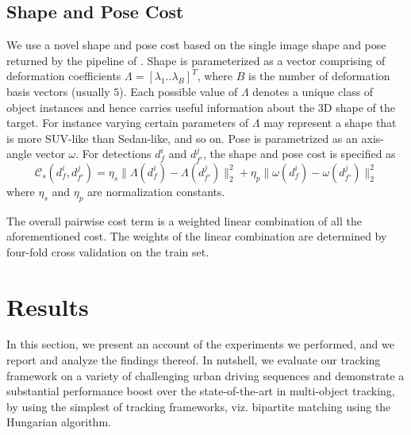 \documentclass[letterpaper, 10 pt, conference]{ieeeconf}
\begin{document}
\subsection{Shape and Pose Cost}

We use a novel shape and pose cost based on the single image shape and pose returned by the pipeline of \cite{KM_ICRA} . Shape is parameterized as a vector comprising of deformation coefficients $\Lambda = \left[\lambda_1 .. \lambda_B\right]^T$, where $B$ is the number of deformation basis vectors (usually $5$). Each possible value of $\Lambda$ denotes a unique class of object instances and hence carries useful information about the 3D shape of the target. For instance varying certain parameters of $\Lambda$ may represent a shape that is more SUV-like than Sedan-like, and so on. Pose is parametrized as an axis-angle vector $\omega$. For detections $d^i_f$ and $d^j_{f'}$, the shape and pose cost is specified as
\begin{equation}
\mathcal{C}_{s} (d^i_f, d^j_{f'}) = \eta_{s} \| \Lambda(d^i_f) - \Lambda(d^j_{f'})  \|_2^2  +  \eta_{p} \| \omega(d^i_f) - \omega(d^j_{f'})  \|_2^2
\label{eqn:shape}
\end{equation}
where $\eta_{s}$ and $\eta_{p}$ are normalization constants.

The overall pairwise cost term is a weighted linear combination of all the aforementioned cost. The weights of the linear combination are determined by four-fold cross validation on the train set.



\section{Results}

In this section, we present an account of the experiments we performed, and we report and analyze the findings thereof. In nutshell, we evaluate our tracking framework on a variety of challenging urban driving sequences and demonstrate a substantial performance boost over the state-of-the-art in multi-object tracking, by using the simplest of tracking frameworks, viz. bipartite matching using the Hungarian algorithm.
\end{document}
